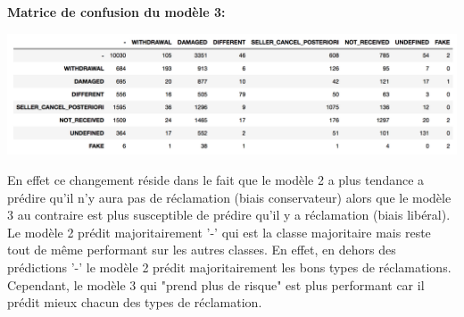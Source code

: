 \textbf{Matrice de confusion du modèle 3:}
\vspace{0.5cm}
\begin{center}
\includegraphics[scale=0.5]{assets/confmat2} 
\end{center}
\vspace{0.5cm}

En effet ce changement réside dans le fait que le modèle 2 a plus tendance a prédire qu'il
n'y aura pas de réclamation (biais conservateur) alors que le modèle 3 au contraire est plus 
susceptible de prédire qu'il y a réclamation (biais libéral). Le modèle 2 prédit 
majoritairement '-' qui est la classe majoritaire mais reste tout de même performant
sur les autres classes. En effet, en dehors des prédictions '-' le modèle 2 prédit 
majoritairement les bons types de réclamations. Cependant, le modèle 3 qui "prend plus de 
risque" est plus performant car il prédit mieux chacun des types de réclamation.

